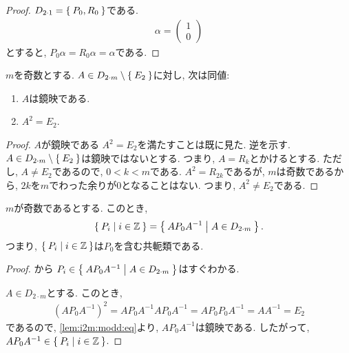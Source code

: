 \begin{proof}
  $D_{2\cdot 1}=\Set{P_0,R_0}$である.
  \begin{align*}
    \alpha=
    \begin{pmatrix}
      1\\0
      \end{pmatrix}
  \end{align*}
  とすると,
  $P_0\alpha = R_0\alpha= \alpha $である.
\end{proof}

\begin{lemma}
  \label{lem:i2m:modd:eq}
  $m$を奇数とする.
  $A\in D_{2\cdot m} \setminus \Set{E_2}$に対し,
  次は同値:
  \begin{enumerate}
  \item $A$は鏡映である.
  \item $A^2=E_2$.
  \end{enumerate}
\end{lemma}
\begin{proof}
  $A$が鏡映である $A^2=E_2$を満たすことは既に見た.
  逆を示す.
  $A\in D_{2\cdot m}\setminus \Set{E_2}$は鏡映ではないとする.
  つまり, $A=R_{k}$とかけるとする.
  ただし, $A\neq E_2$であるので,
  $0<k <m$である.
  $A^2=R_{2k}$であるが, $m$は奇数であるから,
  $2k$を$m$でわった余りが$0$となることはない.
  つまり, $A^{2}\neq E_2$である.
\end{proof}

\begin{prop}
  $m$が奇数であるとする.
  このとき,
  \begin{align*}
    \Set{P_i | i \in \mathbb{Z}} =
    \Set{AP_0A^{-1} | A\in D_{2\cdot m}}.
  \end{align*}
  つまり, $\Set{P_i | i \in \mathbb{Z}}$は$P_0$を含む共軛類である.
\end{prop}
\begin{proof}
 から 
 $P_i\in \Set{AP_0A^{-1} | A\in D_{2\cdot m}}$はすぐわかる.

 $A\in D_{2\cdot m}$とする.
 このとき,
 \begin{align*}
   (AP_0A^{-1})^2 =  AP_0A^{-1} AP_0A^{-1}
   =  AP_0P_0A^{-1}
       =  AA^{-1}
       =  E_2
 \end{align*}
であるので, \cref{lem:i2m:modd:eq}より,
$AP_0A^{-1}$は鏡映である.
したがって,
$AP_0A^{-1}\in \Set{P_i | i \in \mathbb{Z}}$.
\end{proof}

